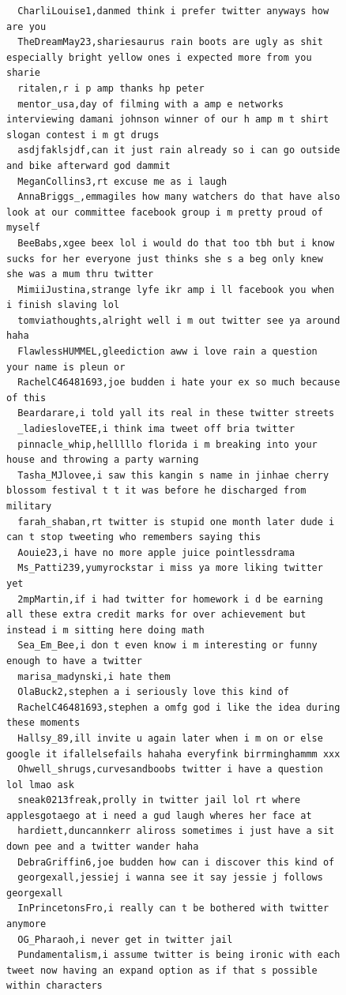\begin{figure}[htpb]
\begin{verbatim}
  CharliLouise1,danmed think i prefer twitter anyways how are you
  TheDreamMay23,shariesaurus rain boots are ugly as shit especially bright yellow ones i expected more from you sharie
  ritalen,r i p amp thanks hp peter
  mentor_usa,day of filming with a amp e networks interviewing damani johnson winner of our h amp m t shirt slogan contest i m gt drugs
  asdjfaklsjdf,can it just rain already so i can go outside and bike afterward god dammit
  MeganCollins3,rt excuse me as i laugh
  AnnaBriggs_,emmagiles how many watchers do that have also look at our committee facebook group i m pretty proud of myself
  BeeBabs,xgee beex lol i would do that too tbh but i know sucks for her everyone just thinks she s a beg only knew she was a mum thru twitter
  MimiiJustina,strange lyfe ikr amp i ll facebook you when i finish slaving lol
  tomviathoughts,alright well i m out twitter see ya around haha
  FlawlessHUMMEL,gleediction aww i love rain a question your name is pleun or
  RachelC46481693,joe budden i hate your ex so much because of this
  Beardarare,i told yall its real in these twitter streets
  _ladiesloveTEE,i think ima tweet off bria twitter
  pinnacle_whip,helllllo florida i m breaking into your house and throwing a party warning
  Tasha_MJlovee,i saw this kangin s name in jinhae cherry blossom festival t t it was before he discharged from military
  farah_shaban,rt twitter is stupid one month later dude i can t stop tweeting who remembers saying this
  Aouie23,i have no more apple juice pointlessdrama
  Ms_Patti239,yumyrockstar i miss ya more liking twitter yet
  2mpMartin,if i had twitter for homework i d be earning all these extra credit marks for over achievement but instead i m sitting here doing math
  Sea_Em_Bee,i don t even know i m interesting or funny enough to have a twitter
  marisa_madynski,i hate them
  OlaBuck2,stephen a i seriously love this kind of
  RachelC46481693,stephen a omfg god i like the idea during these moments
  Hallsy_89,ill invite u again later when i m on or else google it ifallelsefails hahaha everyfink birrminghammm xxx
  Ohwell_shrugs,curvesandboobs twitter i have a question lol lmao ask
  sneak0213freak,prolly in twitter jail lol rt where applesgotaego at i need a gud laugh wheres her face at
  hardiett,duncannkerr aliross sometimes i just have a sit down pee and a twitter wander haha
  DebraGriffin6,joe budden how can i discover this kind of
  georgexall,jessiej i wanna see it say jessie j follows georgexall
  InPrincetonsFro,i really can t be bothered with twitter anymore
  OG_Pharaoh,i never get in twitter jail
  Pundamentalism,i assume twitter is being ironic with each tweet now having an expand option as if that s possible within characters

\end{verbatim}
\end{figure}
